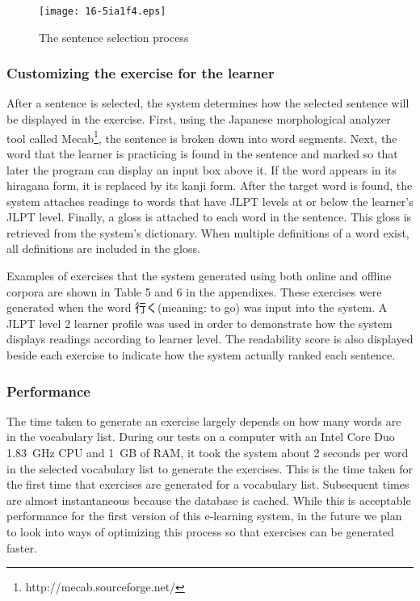 \documentclass[english]{jnlp_1.4}
\begin{document}
\begin{figure}[t]
\begin{center}
  \texttt{[image: 16-5ia1f4.eps]}
\end{center}
  \caption{The sentence selection process}
  \label{fig4}
\end{figure}


\subsubsection{Customizing the exercise for the learner}

After a sentence is selected, the system determines how the selected sentence will be displayed in the exercise. First, using the Japanese morphological analyzer tool called Mecab\footnote{http://mecab.sourceforge.net/}, the sentence is broken down into word segments. Next, the word that the learner is practicing is found in the sentence and marked so that later the program can display an input box above it. If the word appears in its hiragana form, it is replaced by its kanji form. After the target word is found, the system attaches readings to words that have JLPT levels at or below the learner's JLPT level. Finally, a gloss is attached to each word in the sentence. This gloss is retrieved from the system's dictionary. When multiple definitions of a word exist, all definitions are included in the gloss.

Examples of exercises that the system generated using both online and offline corpora are shown in Table 5 and 6 in the appendixes. These exercises were generated when the word 行く(meaning: to go) was input into the system. A JLPT level 2 learner profile was used in order to demonstrate how the system displays readings according to learner level. The readability score is also displayed beside each exercise to indicate how the system actually ranked each sentence. 


\subsubsection{Performance}

The time taken to generate an exercise largely depends on how many words are in the vocabulary list. During our tests on a computer with an Intel Core Duo 1.83~GHz CPU and 1~GB of RAM, it took the system about 2 seconds per word in the selected vocabulary list to generate the exercises. This is the time taken for the first time that exercises are generated for a vocabulary list. Subsequent times are almost instantaneous because the database is cached. While this is acceptable performance for the first version of this e-learning system, in the future we plan to look into ways of optimizing this process so that exercises can be generated faster.
\end{document}
